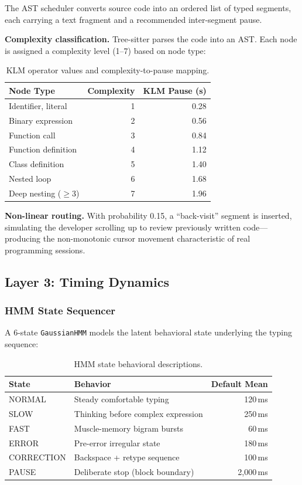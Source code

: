 \documentclass[sigconf,nonacm]{acmart}
\begin{document}
The AST scheduler converts source code into an ordered list of typed segments, each
carrying a text fragment and a recommended inter-segment pause.

\textbf{Complexity classification.} Tree-sitter parses the code into an AST. Each node is
assigned a complexity level (1--7) based on node type:

\begin{table}[t]
\centering
\caption{KLM operator values and complexity-to-pause mapping.}
\begin{tabular}{lrr}
\toprule
Node Type & Complexity & KLM Pause (s) \\
\midrule
Identifier, literal       & 1 & 0.28 \\
Binary expression         & 2 & 0.56 \\
Function call             & 3 & 0.84 \\
Function definition       & 4 & 1.12 \\
Class definition          & 5 & 1.40 \\
Nested loop               & 6 & 1.68 \\
Deep nesting ($\geq$3)    & 7 & 1.96 \\
\bottomrule
\end{tabular}
\label{tab:klm}
\end{table}

\textbf{Non-linear routing.} With probability 0.15, a ``back-visit'' segment is inserted,
simulating the developer scrolling up to review previously written code---producing the
non-monotonic cursor movement characteristic of real programming sessions.

\subsection{Layer 3: Timing Dynamics}

\subsubsection{HMM State Sequencer}

A 6-state \texttt{GaussianHMM} models the latent behavioral state underlying the
typing sequence:

\begin{table}[t]
\centering\small
\caption{HMM state behavioral descriptions.}
\begin{tabular}{llr}
\toprule
State & Behavior & Default Mean \\
\midrule
NORMAL     & Steady comfortable typing          & 120\,ms \\
SLOW       & Thinking before complex expression & 250\,ms \\
FAST       & Muscle-memory bigram bursts        &  60\,ms \\
ERROR      & Pre-error irregular state          & 180\,ms \\
CORRECTION & Backspace + retype sequence        & 100\,ms \\
PAUSE      & Deliberate stop (block boundary)   & 2{,}000\,ms \\
\bottomrule
\end{tabular}
\label{tab:hmm_states}
\end{table}
\end{document}

